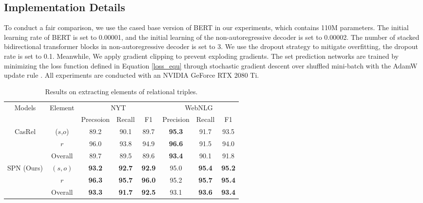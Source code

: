 \documentclass[letterpaper]{article} \usepackage{aaai21}  \usepackage{times}  \usepackage{helvet} \usepackage{courier}  \usepackage[hyphens]{url}  \usepackage{graphicx} \usepackage{amsfonts,amssymb}
\begin{document}
\subsection{Implementation Details}
To conduct a fair comparison, we use the cased base version of BERT in our experiments, which contains 110M parameters. The initial learning rate of BERT is set to 0.00001, and the initial learning of the non-autoregressive decoder is set to 0.00002. The number of stacked bidirectional transformer blocks in non-autoregressive decoder is set to 3. We use the dropout strategy to mitigate overfitting, the dropout rate is set to 0.1. Meanwhile, We apply gradient clipping to prevent exploding gradients. The set prediction networks are trained by minimizing the loss function defined in Equation \ref{loss_equ} through stochastic gradient descent over shuffled mini-batch with the AdamW update rule  \cite{loshchilov2017decoupled}. All experiments are conducted with an NVIDIA GeForce RTX 2080 Ti.

\begin{table*}[thbp]
\begin{center}
\begin{tabular}{c|c|ccc|ccc}
\hline
\multirow{2}{*}{Models}    & \multirow{2}{*}{Element} & \multicolumn{3}{c|}{NYT}   & \multicolumn{3}{c}{WebNLG} \\
\cline{3-8}
                           &                          & Precsoion & Recall & F1   & Precision  & Recall & F1   \\
                           \hline \hline
\multirow{3}{*}{CasRel \cite{wei-etal-2020-novel}}    & ($s$,$o$)                    & 89.2      & 90.1   & 89.7 & \textbf{95.3}       & 91.7   & 93.5 \\
                           & $r$                        & 96.0     & 93.8   & 94.9 & \textbf{96.6}       & 91.5   & 94.0 \\
                           & Overall   & 89.7         & 89.5      & 89.6  &  \textbf{93.4}         & 90.1      & 91.8 \\
                           \hline
\multirow{3}{*}{SPN (Ours)} & $(s,o)$                    & \textbf{93.2}      & \textbf{92.7}   & \textbf{92.9} & 95.0       & \textbf{95.4}   & \textbf{95.2} \\
                           & $r$                        & \textbf{96.3}     & \textbf{95.7}   & \textbf{96.0} & 95.2       & \textbf{ 95.7}   & \textbf{95.4}\\
                           & Overall & \textbf{93.3}         & \textbf{91.7}      & \textbf{92.5} & 93.1         & \textbf{93.6}      & \textbf{93.4}\\
                           \hline
\end{tabular}
\end{center}
\caption{Results on extracting elements of relational triples.}
\label{detail_result}
\end{table*}
\end{document}
